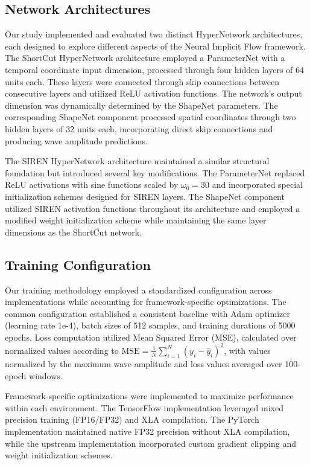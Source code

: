 \documentclass[10pt,journal,compsoc,onecolumn]{IEEEtran}
\begin{document}
\subsection{Network Architectures}
Our study implemented and evaluated two distinct HyperNetwork architectures, each designed to explore different aspects of the Neural Implicit Flow framework. The ShortCut HyperNetwork architecture employed a ParameterNet with a temporal coordinate input dimension, processed through four hidden layers of 64 units each. These layers were connected through skip connections between consecutive layers and utilized ReLU activation functions. The network's output dimension was dynamically determined by the ShapeNet parameters. The corresponding ShapeNet component processed spatial coordinates through two hidden layers of 32 units each, incorporating direct skip connections and producing wave amplitude predictions.

The SIREN HyperNetwork architecture maintained a similar structural foundation but introduced several key modifications. The ParameterNet replaced ReLU activations with sine functions scaled by $\omega_0 = 30$ and incorporated special initialization schemes designed for SIREN layers. The ShapeNet component utilized SIREN activation functions throughout its architecture and employed a modified weight initialization scheme while maintaining the same layer dimensions as the ShortCut network.

\subsection{Training Configuration}
Our training methodology employed a standardized configuration across implementations while accounting for framework-specific optimizations. The common configuration established a consistent baseline with Adam optimizer (learning rate 1e-4), batch sizes of 512 samples, and training durations of 5000 epochs. Loss computation utilized Mean Squared Error (MSE), calculated over normalized values according to $\text{MSE} = \frac{1}{N}\sum_{i=1}^N (y_i - \hat{y}_i)^2$, with values normalized by the maximum wave amplitude and loss values averaged over 100-epoch windows.

Framework-specific optimizations were implemented to maximize performance within each environment. The TensorFlow implementation leveraged mixed precision training (FP16/FP32) and XLA compilation. The PyTorch implementation maintained native FP32 precision without XLA compilation, while the upstream implementation incorporated custom gradient clipping and weight initialization schemes.
\end{document}
